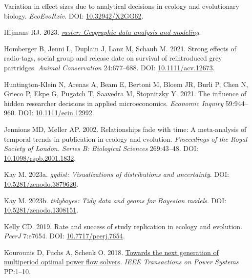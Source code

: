 \documentclass[10pt,a4paper]{article}
\newlength{\cslhangindent}
\newlength{\cslentryspacingunit} %
\newenvironment{CSLReferences}[2] %
 {%
  \setlength{\parindent}{0pt}
  \ifodd #1
  \let\oldpar\par
  \def\par{\hangindent=\cslhangindent\oldpar}
  \fi
  \setlength{\parskip}{#2\cslentryspacingunit}
 }%
 {}
\begin{document}
\begin{CSLReferences}{1}{0}
Variation in effect sizes due to analytical decisions in ecology and evolutionary biology. \emph{EcoEvoRxiv}. DOI: \href{https://doi.org/10.32942/X2GG62}{10.32942/X2GG62}.

Hijmans RJ. 2023. \emph{\href{https://CRAN.R-project.org/package=raster}{{raster}: Geographic data analysis and modeling}}.

Homberger B, Jenni L, Duplain J, Lanz M, Schaub M. 2021. Strong effects of radio-tags, social group and release date on survival of reintroduced grey partridges. \emph{Animal Conservation} 24:677--688. DOI: \href{https://doi.org/10.1111/acv.12673}{10.1111/acv.12673}.

Huntington‐Klein N, Arenas A, Beam E, Bertoni M, Bloem JR, Burli P, Chen N, Grieco P, Ekpe G, Pugatch T, Saavedra M, Stopnitzky Y. 2021. The influence of hidden researcher decisions in applied microeconomics. \emph{Economic Inquiry} 59:944--960. DOI: \href{https://doi.org/10.1111/ecin.12992}{10.1111/ecin.12992}.

Jennions MD, Møller AP. 2002. Relationships fade with time: A meta-analysis of temporal trends in publication in ecology and evolution. \emph{Proceedings of the Royal Society of London. Series B: Biological Sciences} 269:43--48. DOI: \href{https://doi.org/10.1098/rspb.2001.1832}{10.1098/rspb.2001.1832}.

Kay M. 2023a. \emph{{ggdist}: Visualizations of distributions and uncertainty}. DOI: \href{https://doi.org/10.5281/zenodo.3879620}{10.5281/zenodo.3879620}.

Kay M. 2023b. \emph{{tidybayes}: Tidy data and geoms for {Bayesian} models}. DOI: \href{https://doi.org/10.5281/zenodo.1308151}{10.5281/zenodo.1308151}.

Kelly CD. 2019. Rate and success of study replication in ecology and evolution. \emph{PeerJ} 7:e7654. DOI: \href{https://doi.org/10.7717/peerj.7654}{10.7717/peerj.7654}.

Kourounis D, Fuchs A, Schenk O. 2018. \href{https://doi.org/10.1109/TPWRS.2017.2789187}{Towards the next generation of multiperiod optimal power flow solvers}. \emph{IEEE Transactions on Power Systems} PP:1--10.


\end{CSLReferences}
\end{document}
